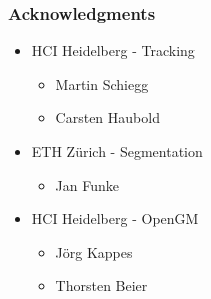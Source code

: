 \begin{frame}
    \frametitle{Acknowledgments}
    \begin{itemize}
          \item HCI Heidelberg - Tracking
        \begin{itemize}
              \item[] Martin Schiegg
              \item[] Carsten Haubold
        \end{itemize}
          \item ETH Z\"urich - Segmentation
        \begin{itemize}
              \item[] Jan Funke
        \end{itemize}
          \item HCI Heidelberg - OpenGM
        \begin{itemize}
              \item[] J\"org Kappes
              \item[] Thorsten Beier
        \end{itemize}
    \end{itemize}
\end{frame}


